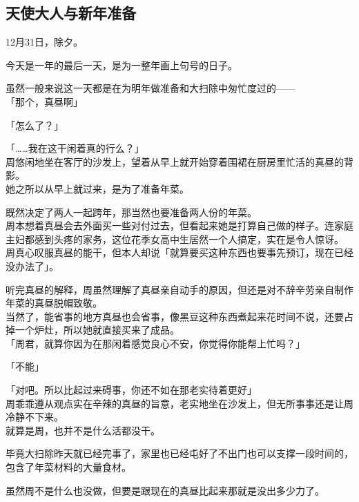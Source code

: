 \subsection{天使大人与新年准备}

12月31日，除夕。

今天是一年的最后一天，是为一整年画上句号的日子。

虽然一般来说这一天都是在为明年做准备和大扫除中匆忙度过的——\\

「那个，真昼啊」

「怎么了？」

「……我在这干闲着真的行么？」\\

周悠闲地坐在客厅的沙发上，望着从早上就开始穿着围裙在厨房里忙活的真昼的背影。\\

她之所以从早上就过来，是为了准备年菜。

既然决定了两人一起跨年，那当然也要准备两人份的年菜。\\

周本想着真昼会去外面买一些对付过去，但看起来她是打算自己做的样子。连家庭主妇都感到头疼的家务，这位花季女高中生居然一个人搞定，实在是令人惊讶。\\

周真心叹服真昼的能干，但本人却说「就算要买这种东西也要事先预订，现在已经没办法了」。

听完真昼的解释，周虽然理解了真昼亲自动手的原因，但还是对不辞辛劳亲自制作年菜的真昼脱帽致敬。\\

当然了，能省事的地方真昼也会省事，像黑豆这种东西煮起来花时间不说，还要占掉一个炉灶，所以她就直接买来了成品。\\

「周君，就算你因为在那闲着感觉良心不安，你觉得你能帮上忙吗？」

「不能」

「对吧。所以比起过来碍事，你还不如在那老实待着更好」\\

周乖乖遵从观点实在辛辣的真昼的旨意，老实地坐在沙发上，但无所事事还是让周冷静不下来。\\

就算是周，也并不是什么活都没干。

毕竟大扫除昨天就已经完事了，家里也已经屯好了不出门也可以支撑一段时间的，包含了年菜材料的大量食材。

虽然周不是什么也没做，但要是跟现在的真昼比起来那就是没出多少力了。\\

